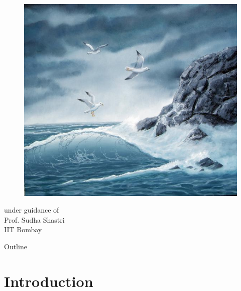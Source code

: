 \documentclass{beamer}
\begin{document}
\begin{frame}[plain]
\titlepage
\begin{center}
\begin{figure}[htp]
  \begin{center}
    \centering
    \includegraphics[scale=0.17]{title.jpg}
  \end{center}
\end{figure}
under guidance of\\
Prof. Sudha Shastri\\
IIT Bombay
\end{center}
\end{frame}
\begin{frame}{Outline}
  \begin{multicols}{2}
  \tableofcontents  
  \end{multicols}
\end{frame}
\section{Introduction}
\end{document}
